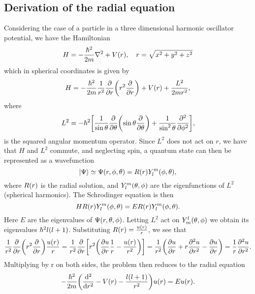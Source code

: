 \subsection*{Derivation of the radial equation}
\label{sec:radeq}
Considering the case of a particle in a three dimensional harmonic oscillator
potential, we have the Hamiltonian
  \begin{equation}
    H = -\frac{\hbar^2}{2m}\laplacian + V\qty(r), \quad r = \sqrt{x^2 + y^2 + z^2}
  \end{equation}
which in spherical coordinates is given by
  \begin{equation}
    H = -\frac{\hbar^2}{2m}\frac{1}{r^2}\pdv{}{r}\qty(r^2\pdv{}{r}) + V\qty(r) + \frac{L^2}{2mr^2},
  \end{equation}
where
  \begin{equation}
    L^2 = -\hbar^2 \qty[\frac{1}{\sin\theta}\pdv{}{\theta}\qty(\sin{\theta}\pdv{\theta})
    + \frac{1}{\sin^2\theta}\pdv[2]{}{\phi}],
  \end{equation}
is the squared angular momentum operator. Since $L^2$ does not act on
$r$, we have that $H$ and $L^2$ commute, and neglecting spin, a quantum state can
then be represented as a wavefunction
  \begin{equation}
    \ket{\Psi} \simeq \Psi\qty(r, \phi, \theta) = R\qty(r)Y_{l}^m\qty(\phi, \theta),
  \end{equation}
where $R\qty(r)$ is the radial solution, and $Y_{l}^m\qty(\theta, \phi)$ are the
eigenfunctions of $L^2$ (spherical harmonics).
The Schrodinger equation is then
  \begin{equation}
    HR\qty(r)Y_{l}^m\qty(\phi, \theta) = ER\qty(r)Y_{l}^m\qty(\phi, \theta).
  \end{equation}
Here $E$ are the eigenvalues of $\Psi\qty(r, \theta, \phi)$. Letting $L^2$ act on $Y_{m}^l\qty(\theta, \phi)$ we obtain
its eigenvalues $\hbar^2 l\qty(l+1)$. Substituting $R\qty(r) = \frac{u\qty(r)}{r}$,
we see that
  \[
    \frac{1}{r^2}\pdv{}{r}\qty(r^2\pdv{}{r})\frac{u\qty(r)}{r}
    = \frac{1}{r^2}\pdv{}{r}\qty[r^2\qty(\pdv{u}{r}\frac{1}{r} - \frac{u\qty(r)}{r^2})]
    = \frac{1}{r^2}\qty(\pdv{u}{r} + r\pdv[2]{u}{r} - \pdv{u}{r}) = \frac{1}{r}\pdv[2]{u}{r}.
  \]
Multiplying by r on both sides, the problem then reduces to the radial equation
\begin{equation}
  -\frac{\hbar^2}{2m}\qty(\dv[2]{}{r} - V(r) - \frac{l\qty(l+1)}{r^2})u\qty(r) = Eu\qty(r).
\end{equation}

